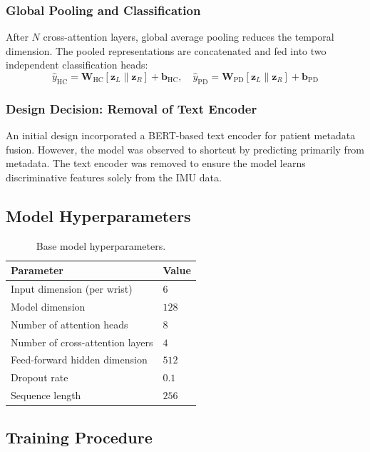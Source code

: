 \documentclass[conference]{IEEEtran}
\begin{document}
\subsubsection{Global Pooling and Classification}
After $N$ cross-attention layers, global average pooling reduces the temporal dimension. The pooled representations are concatenated and fed into two independent classification heads:
\begin{equation}
\hat{y}_{\text{HC}} = \mathbf{W}_{\text{HC}} [\mathbf{z}_L \| \mathbf{z}_R] + \mathbf{b}_{\text{HC}}, \quad
\hat{y}_{\text{PD}} = \mathbf{W}_{\text{PD}} [\mathbf{z}_L \| \mathbf{z}_R] + \mathbf{b}_{\text{PD}}
\end{equation}

\subsubsection{Design Decision: Removal of Text Encoder}
An initial design incorporated a BERT-based text encoder for patient metadata fusion. However, the model was observed to shortcut by predicting primarily from metadata. The text encoder was removed to ensure the model learns discriminative features solely from the IMU data.

\subsection{Model Hyperparameters}

\begin{table}[H]
\centering
\caption{Base model hyperparameters.}
\label{tab:hyperparams}
\begin{tabular}{ll}
\toprule
\textbf{Parameter} & \textbf{Value} \\
\midrule
Input dimension (per wrist)     & $6$   \\
Model dimension                 & $128$ \\
Number of attention heads        & $8$   \\
Number of cross-attention layers & $4$   \\
Feed-forward hidden dimension   & $512$ \\
Dropout rate                     & $0.1$ \\
Sequence length                  & $256$ \\
\bottomrule
\end{tabular}
\end{table}

\subsection{Training Procedure}
\end{document}
